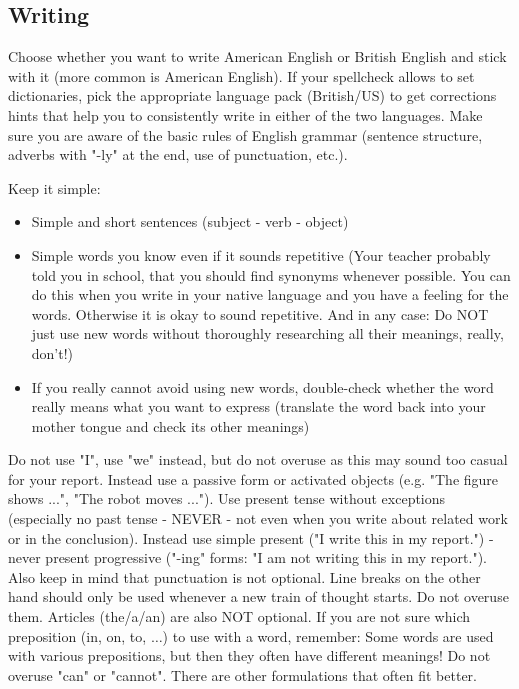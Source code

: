 \subsection{Writing}

Choose whether you want to write American English or British English and stick with it (more common is American English). If your spellcheck allows to set dictionaries, pick the appropriate language pack (British/US) to get corrections hints that help you to consistently write in either of the two languages.
Make sure you are aware of the basic rules of English grammar (sentence structure, adverbs with "-ly" at the end, use of punctuation, etc.).

Keep it simple: 

\begin{itemize}
	\item Simple and short sentences (subject - verb - object)
	\item Simple words you know even if it sounds repetitive (Your teacher probably told you in school, that you should find synonyms whenever possible. You can do this when you write in your native language and you have a feeling for the words. Otherwise it is okay to sound repetitive. And in any case: Do NOT just use new words without thoroughly researching all their meanings, really, don't!)
	\item If you really cannot avoid using new words, double-check whether the word really means what you want to express (translate the word back into your mother tongue and check its other meanings)
\end{itemize}

Do not use "I", use "we" instead, but do not overuse as this may sound too casual for your report. Instead use a passive form or activated objects (e.g. "The figure shows ...", "The robot moves ..."). Use present tense without exceptions (especially no past tense - NEVER - not even when you write about related work or in the conclusion). Instead use simple present ("I write this in my report.") - never present progressive ("-ing" forms: "I am not writing this in my report."). Also keep in mind that punctuation is not optional. Line breaks on the other hand should only be used whenever a new train of thought starts. Do not overuse them. Articles (the/a/an) are also NOT optional. If you are not sure which preposition (in, on, to, $\ldots$) to use with a word, remember: Some words are used with various prepositions, but then they often have different meanings! Do not overuse "can" or "cannot". There are other formulations that often fit better.


